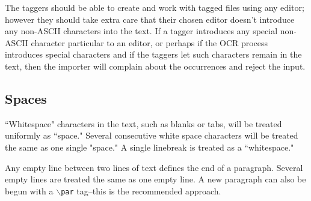 \documentclass[11pt]{article}
\begin{document}
The taggers should be able to create and work with tagged files using
any editor; however they should take extra care that their chosen
editor doesn't introduce any non-ASCII characters into the text. If a
tagger introduces any special non-ASCII character particular to an
editor, or perhaps if the OCR process introduces special characters
and if the taggers let such characters remain in the text, then the
importer will complain about the occurrences and reject the input.





\subsection{Spaces}

``Whitespace" characters in the text, such as blanks or tabs, will be
treated uniformly as ``space." Several consecutive white space
characters will be treated the same as one single "space." A single
linebreak is treated as a ``whitespace."

Any empty line between two lines of text defines the end of a
paragraph. Several empty lines are treated the same as one empty
line. A new paragraph can also be begun with a {\tt $\backslash$par}
tag--this is the recommended approach.







\end{document}
